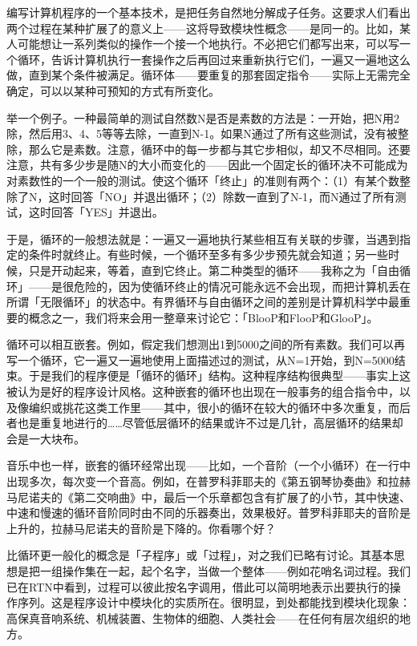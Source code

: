 \documentclass[
  12pt,
  twoside,
  openright,
  oldfontcommands,
]{memoir}
\begin{document}
编写计算机程序的一个基本技术，是把任务自然地分解成子任务。这要求人们看出两个过程在某种扩展了的意义上------这将导致模块性概念------是同一的。比如，某人可能想让一系列类似的操作一个接一个地执行。不必把它们都写出来，可以写一个循环，告诉计算机执行一套操作之后再回过来重新执行它们，一遍又一遍地这么做，直到某个条件被满足。循环体------要重复的那套固定指令------实际上无需完全确定，可以以某种可预知的方式有所变化。

举一个例子。一种最简单的测试自然数N是否是素数的方法是：一开始，把N用2除，然后用3、4、5等等去除，一直到N-1。如果N通过了所有这些测试，没有被整除，那么它是素数。注意，循环中的每一步都与其它步相似，却又不尽相同。还要注意，共有多少步是随N的大小而变化的------因此一个固定长的循环决不可能成为对素数性的一个一般的测试。使这个循环「终止」的准则有两个：（1）有某个数整除了N，这时回答「NO」并退出循环；（2）除数一直到了N-1，而N通过了所有测试，这时回答「YES」并退出。

于是，循环的一般想法就是：一遍又一遍地执行某些相互有关联的步骤，当遇到指定的条件时就终止。有些时候，一个循环至多有多少步预先就会知道；另一些时候，只是开动起来，等着，直到它终止。第二种类型的循环------我称之为「自由循环」------是很危险的，因为使循环终止的情况可能永远不会出现，而把计算机丢在所谓「无限循环」的状态中。有界循环与自由循环之间的差别是计算机科学中最重要的概念之一，我们将来会用一整章来讨论它：「BlooP和FlooP和GlooP」。

循环可以相互嵌套。例如，假定我们想测出1到5000之间的所有素数。我们可以再写一个循环，它一遍又一遍地使用上面描述过的测试，从N=1开始，到N=5000结束。于是我们的程序便是「循环的循环」结构。这种程序结构很典型------事实上这被认为是好的程序设计风格。这种嵌套的循环也出现在一般事务的组合指令中，以及像编织或挑花这类工作里------其中，很小的循环在较大的循环中多次重复，而后者也是重复地进行的\ldots\ldots 尽管低层循环的结果或许不过是几针，高层循环的结果却会是一大块布。

音乐中也一样，嵌套的循环经常出现------比如，一个音阶（一个小循环）在一行中出现多次，每次变一个音高。例如，在普罗科菲耶夫的《第五钢琴协奏曲》和拉赫马尼诺夫的《第二交响曲》中，最后一个乐章都包含有扩展了的小节，其中快速、中速和慢速的循环音阶同时由不同的乐器奏出，效果极好。普罗科菲耶夫的音阶是上升的，拉赫马尼诺夫的音阶是下降的。你看哪个好？

比循环更一般化的概念是「子程序」或「过程」，对之我们已略有讨论。其基本思想是把一组操作集在一起，起个名字，当做一个整体------例如花哨名词过程。我们已在RTN中看到，过程可以彼此按名字调用，借此可以简明地表示出要执行的操作序列。这是程序设计中模块化的实质所在。很明显，到处都能找到模块化现象：高保真音响系统、机械装置、生物体的细胞、人类社会------在任何有层次组织的地方。
\end{document}
